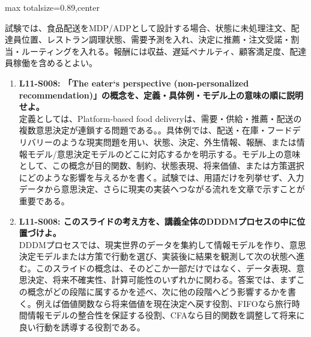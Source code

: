 \begin{minipage}[t]{0.58\textwidth}
\begin{adjustbox}{max totalsize={\textwidth}{0.89\textheight},center}
\begin{minipage}{\textwidth}
試験では、食品配送をMDP/ADPとして設計する場合、状態に未処理注文、配達員位置、レストラン調理状態、需要予測を入れ、決定に推薦・注文受諾・割当・ルーティングを入れる。報酬には収益、遅延ペナルティ、顧客満足度、配達員稼働を含めるとよい。\par{}\begin{enumerate}\item \textbf{L11-S008: 「The eater‘s perspective (non-personalized recommendation)」の概念を、定義・具体例・モデル上の意味の順に説明せよ。}\\定義としては、Platform-based food deliveryは、需要・供給・推薦・配送の複数意思決定が連鎖する問題である。。具体例では、配送・在庫・フードデリバリーのような現実問題を用い、状態、決定、外生情報、報酬、または情報モデル/意思決定モデルのどこに対応するかを明示する。モデル上の意味として、この概念が目的関数、制約、状態表現、将来価値、または方策選択にどのような影響を与えるかを書く。試験では、用語だけを列挙せず、入力データから意思決定、さらに現実の実装へつながる流れを文章で示すことが重要である。\item \textbf{L11-S008: このスライドの考え方を、講義全体のDDDMプロセスの中に位置づけよ。}\\DDDMプロセスでは、現実世界のデータを集約して情報モデルを作り、意思決定モデルまたは方策で行動を選び、実装後に結果を観測して次の状態へ進む。このスライドの概念は、そのどこか一部だけではなく、データ表現、意思決定、将来不確実性、計算可能性のいずれかに関わる。答案では、まずこの概念がどの段階に属するかを述べ、次に他の段階へどう影響するかを書く。例えば価値関数なら将来価値を現在決定へ戻す役割、FIFOなら旅行時間情報モデルの整合性を保証する役割、CFAなら目的関数を調整して将来に良い行動を誘導する役割である。\end{enumerate}
\end{minipage}
\end{adjustbox}
\end{minipage}


